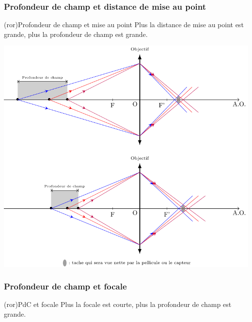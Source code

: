 \documentclass[../../main/main.tex]{subfiles}
\begin{document}
\subsubsection{Profondeur de champ et distance de mise au point}

\begin{tcb}(ror){Profondeur de champ et mise au point}
	Plus la distance de mise au point est grande, plus la profondeur de champ est
	grande.
\end{tcb}

\begin{center}
	\includegraphics[scale=.90]{pfd_chp-map-a}
\end{center}

\subsubsection{Profondeur de champ et focale}

\begin{tcb}(ror){PdC et focale}
	Plus la focale est courte, plus la profondeur de champ est grande.
\end{tcb}
\end{document}
